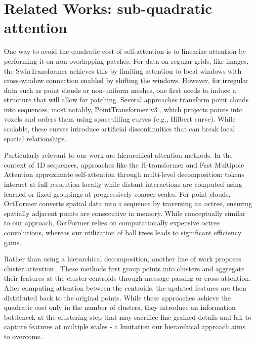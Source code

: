 \section{Related Works: sub-quadratic attention}

One way to avoid the quadratic cost of self-attention is to linearize attention by performing it on non-overlapping patches. %
For data on regular grids, like images, the SwinTransformer \cite{Liu2021SwinTH} achieves this by limiting attention to local windows with cross-window connection enabled by shifting the windows.
However, for irregular data such as point clouds or non-uniform meshes, one first needs to induce a structure that will allow for patching. Several approaches \cite{Liu2023FlatFormerFW, Sun2022SWFormerSW} transform point clouds into sequences, most notably, PointTransformer v3 \cite{Wu2023PointTV}, which projects points into voxels and orders them using space-filling curves (e.g., Hilbert curve). While scalable, these curves introduce artificial discontinuities that can break local spatial relationships.

Particularly relevant to our work are hierarchical attention methods. In the context of 1D sequences, approaches like the H-transformer \cite{Zhu2021HTransformer1DFO} and Fast Multipole Attention \cite{Kang2023FastMA} approximate self-attention through multi-level decomposition: tokens interact at full resolution locally while distant interactions are computed using learned or fixed groupings at progressively coarser scales. For point clouds, OctFormer \cite{Wang2023OctFormerOT} converts spatial data into a sequence by traversing an octree, ensuring spatially adjacent points are consecutive in memory. While conceptually similar to our approach, OctFormer relies on computationally expensive octree convolutions, whereas our utilization of ball trees leads to significant efficiency gains.

Rather than using a hierarchical decomposition, another line of work proposes cluster attention \cite{Janny2023EagleLL, alkin2024upt}. These methods first group points into clusters and aggregate their features at the cluster centroids through message passing or cross-attention. After computing attention between the centroids, the updated features are then distributed back to the original points. While these approaches achieve the quadratic cost only in the number of clusters, they introduce an information bottleneck at the clustering step that may sacrifice fine-grained details and fail to capture features at multiple scales - a limitation our hierarchical approach aims to overcome.











